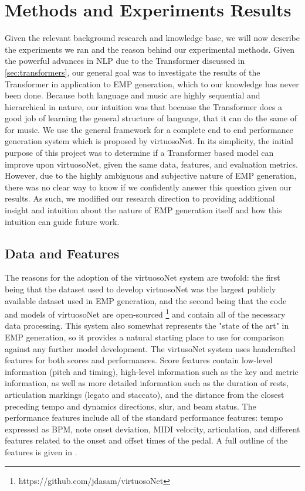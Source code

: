 \chapter{Methods and Experiments Results}\label{ch:ch5}
Given the relevant background research and knowledge base, we will now describe the experiments we ran and the reason behind our experimental methods. Given the powerful advances in NLP due to the Transformer discussed in \ref{sec:transformers}, our general goal was to investigate the results of the Transformer in application to EMP generation, which to our knowledge has never been done. Because both language and music are highly sequential and hierarchical in nature, our intuition was that because the Transformer does a good job of learning the general structure of language, that it can do the same of for music. We use the general framework for a complete end to end performance generation system which is proposed by virtuosoNet. In its simplicity, the initial purpose of this project was to determine if a Transformer based model can improve upon virtuosoNet, given the same data, features, and evaluation metrics. However, due to the highly ambiguous and subjective nature of EMP generation, there was no clear way to know if we confidently answer this question given our results. As such, we modified our research direction to providing additional insight and intuition about the nature of EMP generation itself and how this intuition can guide future work. 

\section{Data and Features}
The reasons for the adoption of the virtuosoNet system are twofold: the first being that the dataset used to develop virtuosoNet was the largest publicly available dataset used in EMP generation, and the second being that the code and models of virtuosoNet are open-sourced \footnote{https://github.com/jdasam/virtuosoNet} and contain all of the necessary data processing. This system also somewhat represents the "state of the art" in EMP generation, so it provides a natural starting place to use for comparison against any further model development. The virtusoNet system uses handcrafted features for both scores and performances. Score features contain low-level information (pitch and timing), high-level information such as the key and metric information, as well as more detailed information such as the duration of rests, articulation markings (legato and staccato), and the distance from the closest preceding tempo and dynamics directions, slur, and beam status. The performance features include all of the standard performance features: tempo expressed as BPM, note onset deviation, MIDI velocity, articulation, and different features related to the onset and offset times of the pedal. A full outline of the features is given in \cite{jeong2019score}. 

